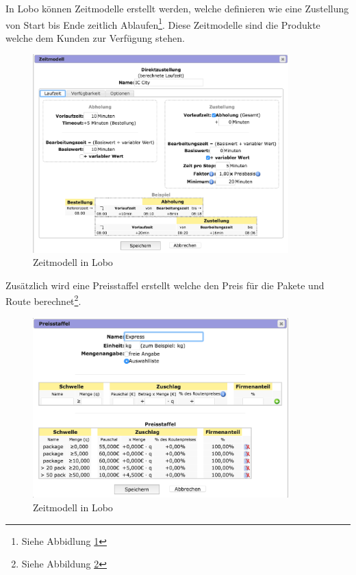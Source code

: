 In Lobo können Zeitmodelle erstellt werden, welche definieren wie eine Zustellung von Start bis Ende zeitlich Ablaufen\footnote{Siehe Abbidlung \ref{fig1:lobozeitmodell}}. Diese Zeitmodelle sind die Produkte welche dem Kunden zur Verfügung stehen.
\begin{figure}[ht]
	\centering
  \includegraphics[width=0.88\textwidth]{images/loboZeitmodell.png}
	\caption{Zeitmodell in Lobo}
	\label{fig1:lobozeitmodell}
\end{figure}

Zusätzlich wird eine Preisstaffel erstellt welche den Preis für die Pakete und Route berechnet\footnote{Siehe Abbildung \ref{fig1:lobopreisstaffel}}.

\begin{figure}[ht]
	\centering
  \includegraphics[width=0.88\textwidth]{images/loboPreisstaffel.png}
	\caption{Zeitmodell in Lobo}
	\label{fig1:lobopreisstaffel}
\end{figure}


